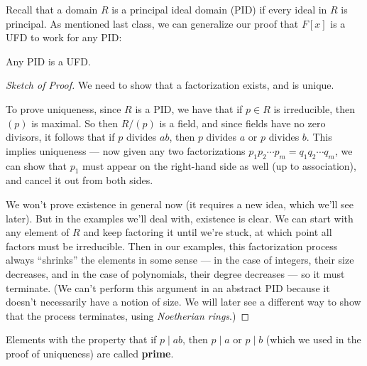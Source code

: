
Recall that a domain $R$ is a principal ideal domain (PID) if every ideal in $R$ is principal. As mentioned last class, we can generalize our proof that $F[x]$ is a UFD to work for any PID:

\begin{theorem}
Any PID is a UFD.
\end{theorem}

\begin{proof}[Sketch of Proof]
We need to show that a factorization exists, and is unique. 

To prove uniqueness, since $R$ is a PID, we have that if $p \in R$ is irreducible, then $(p)$ is maximal. So then $R/(p)$ is a field, and since fields have no zero divisors, it follows that if $p$ divides $ab$, then $p$ divides $a$ or $p$ divides $b$. This implies uniqueness --- now given any two factorizations $p_1p_2\cdots p_m = q_1q_2\cdots q_m$, we can show that $p_1$ must appear on the right-hand side as well (up to association), and cancel it out from both sides. 

We won't prove existence in general now (it requires a new idea, which we'll see later). But in the examples we'll deal with, existence is clear. We can start with any element of $R$ and keep factoring it until we're stuck, at which point all factors must be irreducible. Then in our examples, this factorization process always ``shrinks'' the elements in some sense --- in the case of integers, their size decreases, and in the case of polynomials, their degree decreases --- so it must terminate. (We can't perform this argument in an abstract PID because it doesn't necessarily have a notion of size. We will later see a different way to show that the process terminates, using \emph{Noetherian rings}.)%
\end{proof}

\begin{note}
    Elements with the property that if $p \mid ab$, then $p \mid a$ or $p \mid b$ (which we used in the proof of uniqueness) are called \textbf{prime}. 
\end{note}

